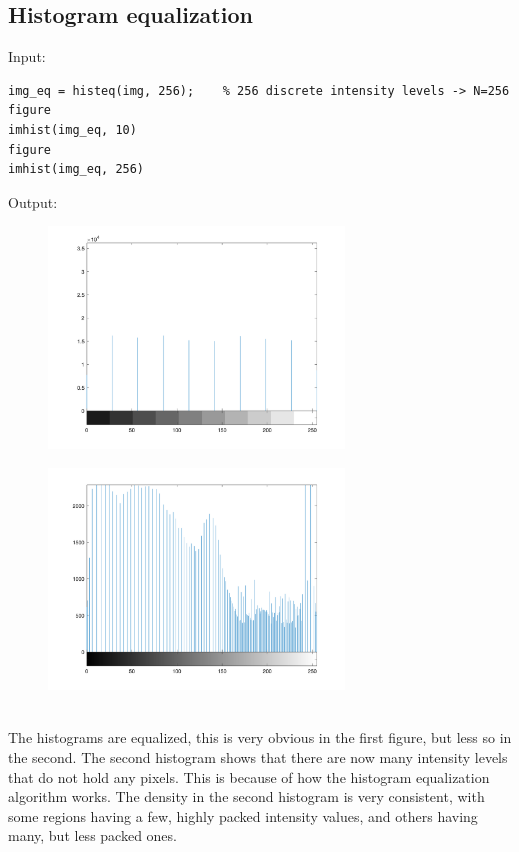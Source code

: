 \documentclass[12pt, a4paper]{article}
\begin{document}
\subsection{Histogram equalization}
Input:
\begin{verbatim}
img_eq = histeq(img, 256);    % 256 discrete intensity levels -> N=256
figure
imhist(img_eq, 10)
figure
imhist(img_eq, 256)
\end{verbatim}
Output:
\begin{figure}[h]
    \centering
    \includegraphics[width=0.7\textwidth]{fig5.png}
\end{figure}
\begin{figure}[H]
    \centering
    \includegraphics[width=0.7\textwidth]{fig6.png}
\end{figure}
~\\
The histograms are equalized, this is very obvious in the first figure, but less so in the second. The second histogram shows that there are now many intensity levels that do not hold any pixels. This is because of how the histogram equalization algorithm works. The density in the second histogram is very consistent, with some regions having a few, highly packed intensity values, and others having many, but less packed ones.
\end{document}
